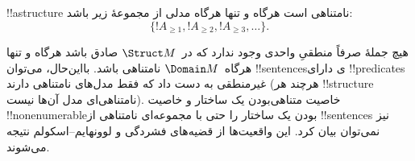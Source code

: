 \documentclass[../../../include/open-logic-section]{subfiles}
\begin{document}
\begin{prop}
!!a{structure} نامتناهی است هرگاه و تنها هرگاه مدلی از مجموعهٔ زیر باشد:
\[
\{!A_{\ge 1}, !A_{\ge 2}, !A_{\ge 3}, \dots \}.
\]
\end{prop}

هیچ جملهٔ صرفاً منطقیِ واحدی وجود ندارد که در~$\Struct M$ صادق
باشد هرگاه و تنها هرگاه~$\Domain M$ نامتناهی باشد. بااین‌حال، می‌توان
!!{sentence}sی دارای !!{predicate}s غیرمنطقی به دست داد که فقط مدل‌های
نامتناهی دارند (هرچند هر !!{structure} نامتناهی‌ای مدل آن‌ها نیست).
خاصیت متناهی‌بودن یک ساختار و خاصیت !!{nonenumerable}بودن یک ساختار را
حتی با مجموعه‌ای نامتناهی از !!{sentence}s نیز نمی‌توان بیان کرد. این
واقعیت‌ها از قضیه‌های فشردگی و لوونهایم--اسکولم نتیجه می‌شوند.
\end{document}
